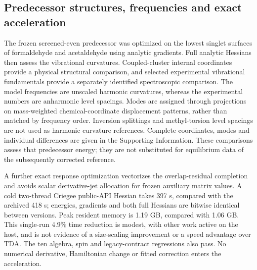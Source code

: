 \documentclass[11pt,a4paper]{article}
\begin{document}
\subsection{Predecessor structures, frequencies and exact acceleration}
The frozen screened-even predecessor was optimized on the lowest singlet surfaces of
formaldehyde and acetaldehyde using analytic gradients. Full analytic
Hessians then assess the vibrational curvatures. Coupled-cluster internal
coordinates provide a physical structural comparison,\cite{geometries2017}
and selected experimental vibrational fundamentals provide a separately
identified spectroscopic comparison.\cite{formaldehydespectrum1969,acetaldehydespectrum1981}
The model frequencies are unscaled harmonic curvatures, whereas the
experimental numbers are anharmonic level spacings. Modes are assigned
through projections on mass-weighted chemical-coordinate displacement
patterns, rather than matched by frequency order. Inversion splittings and
methyl-torsion level spacings are not used as harmonic curvature references.
Complete coordinates, modes and individual differences are given in the
Supporting Information. These comparisons assess that predecessor energy;
they are not substituted for equilibrium data of the subsequently corrected reference.

A further exact response optimization vectorizes the overlap-residual
completion and avoids scalar derivative-jet allocation for frozen
auxiliary matrix values. A cold two-thread Criegee public-API Hessian takes
397 s, compared with the archived 418 s; energies, gradients and both full
Hessians are bitwise identical between versions. Peak resident memory is
1.19 GB, compared with 1.06 GB. This single-run 4.9\% time reduction is
modest, with other work active on the host, and is not evidence of a
size-scaling improvement or a speed advantage over TDA. The ten algebra,
spin and legacy-contract regressions also pass. No numerical derivative,
Hamiltonian change or fitted correction enters the acceleration.
\end{document}
